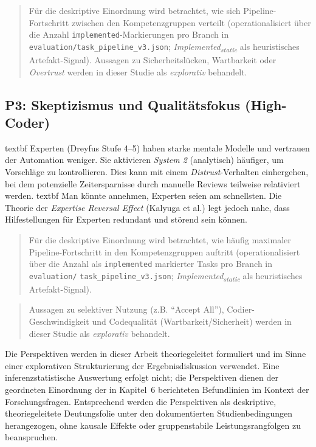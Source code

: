 \begin{quote}
Für die deskriptive Einordnung wird betrachtet, wie sich Pipeline-Fortschritt zwischen den Kompetenzgruppen verteilt (operationalisiert über die Anzahl \texttt{implemented}-Markierungen pro Branch in \nolinkurl{evaluation/task_pipeline_v3.json}; \textit{Implemented\textsubscript{static}} als heuristisches Artefakt-Signal). Aussagen zu Sicherheitslücken, Wartbarkeit oder \emph{Overtrust} werden in dieser Studie als \emph{explorativ} behandelt.
\end{quote}

\subsection{P3: Skeptizismus und Qualitätsfokus (High-Coder)}
\noindent\csname textbf Experten (Dreyfus Stufe 4--5) haben starke mentale Modelle und vertrauen der Automation weniger. Sie aktivieren \emph{System 2} (analytisch) häufiger, um Vorschläge zu kontrollieren. Dies kann mit einem \emph{Distrust}-Verhalten einhergehen, bei dem potenzielle Zeitersparnisse durch manuelle Reviews teilweise relativiert werden.
\noindent\csname textbf Man könnte annehmen, Experten seien am schnellsten. Die Theorie der \emph{Expertise Reversal Effect} (Kalyuga et al.) legt jedoch nahe, dass Hilfestellungen für Experten redundant und störend sein können.

\begin{quote}
Für die deskriptive Einordnung wird betrachtet, wie häufig maximaler\linebreak
Pipeline\mbox{-}Fortschritt in den Kompetenzgruppen auftritt (operationalisiert über\linebreak
die Anzahl als \texttt{implemented} markierter Tasks pro Branch in \nolinkurl{evaluation/}\linebreak
\nolinkurl{task_pipeline_v3.json}; \textit{Implemented\textsubscript{static}} als heuristisches Artefakt-Signal).
\end{quote}

\begin{quote}
Aussagen zu selektiver Nutzung (z.B. \enquote{Accept All}), Codier-Geschwindigkeit und Codequalität (Wartbarkeit/Sicherheit) werden in dieser Studie als \emph{explorativ} behandelt.
\end{quote}

Die Perspektiven werden in dieser Arbeit theoriegeleitet formuliert und im Sinne einer explorativen Strukturierung der Ergebnisdiskussion verwendet. Eine inferenzstatistische Auswertung erfolgt nicht; die Perspektiven dienen der geordneten Einordnung der in Kapitel~6 berichteten Befundlinien im Kontext der Forschungsfragen. Entsprechend werden die Perspektiven als deskriptive, theoriegeleitete Deutungsfolie unter den dokumentierten Studienbedingungen herangezogen, ohne kausale Effekte oder gruppenstabile Leistungsrangfolgen zu beanspruchen.

